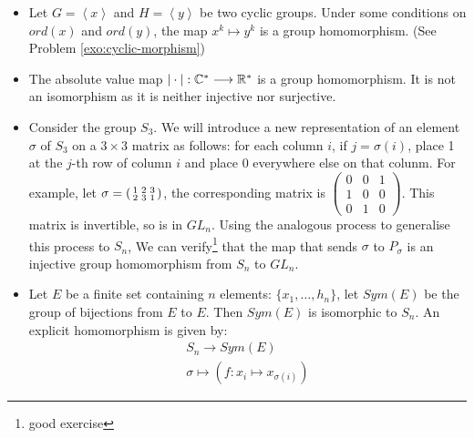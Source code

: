 \begin{example}
\begin{itemize}
        \item Let $G = \left\langle x \right\rangle$ and $H = \left\langle y  \right\rangle$ be two cyclic groups. Under some conditions on $ord(x)$ and $ord(y)$, the map $x^k \longmapsto y^k$ is a group homomorphism. (See Problem \ref{exo:cyclic-morphism})

        \item The absolute value map $|\cdot|: \mathbb{C}^* \longrightarrow \mathbb{R}^*$ is a group homomorphism. It is not an isomorphism as it is neither injective nor surjective. 
        
        \item Consider the group $S_3$. We will introduce a new representation of an element $\sigma$ of $S_3$ on a $3 \times 3$ matrix as follows: for each column $i$, if $j=\sigma(i)$, place 1 at the $j$-th row of column $i$ and place 0 everywhere else on that colunm. For example, let $\sigma = \begin{psmallmatrix}
            1 & 2 & 3 \\
            2 & 3 & 1
        \end{psmallmatrix}$, the corresponding matrix is $\begin{pmatrix}
            0 & 0 & 1 \\
            1 &0 &0 \\
            0& 1& 0
        \end{pmatrix}
        $. This matrix is invertible, so is in $GL_n$. 
        Using the analogous process to generalise this process to $S_n$, We can verify\footnote{good exercise} that the map that sends $\sigma$ to $P_{\sigma}$ is an injective group homomorphism from $S_n$ to $GL_n$. 
        \item Let $E$ be a finite set containing $n$ elements: $\{x_1, \hdots, h_n\}$, let $Sym(E)$ be the group of bijections from $E$ to $E$. Then $Sym(E)$ is isomorphic to $S_n$. An explicit homomorphism is given by: 
        \begin{equation*}
            \begin{split}
                S_n \longrightarrow Sym(E) \\
                \sigma \longmapsto (f: x_i \mapsto x_{\sigma(i)})
            \end{split}
        \end{equation*}
    \end{itemize}
\end{example}
